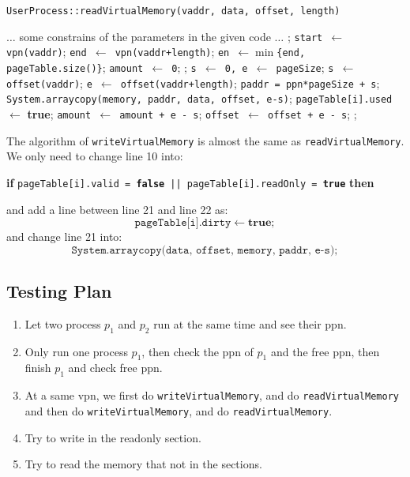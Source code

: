 \documentclass{article}
\begin{document}
\begin{spacing}{1.1}
\begin{algorithm}[htbp]
  \caption{\texttt{UserProcess::readVirtualMemory(vaddr, data, offset, length)}}
  \begin{algorithmic}[1]
    \State $\dots$ some constrains of the parameters in the given code $\dots$ 
    ;
    \EndIf
    \State \texttt{start $\gets$  vpn(vaddr)};
    \State \texttt{end $\gets$  vpn(vaddr+length)};
    \State \texttt{en $\gets \min$\{end, pageTable.size()\}};
    \State \texttt{amount $\gets$  0};
    ;
    \EndIf
    \State \texttt{s $\gets$ 0, e $\gets$ pageSize};
    \State \texttt{s $\gets$  offset(vaddr)};
    \EndIf
    \State \texttt{e $\gets$  offset(vaddr+length)};
    \EndIf
    \State \texttt{paddr = ppn*pageSize + s};
    \State \texttt{System.arraycopy(memory, paddr, data, offset, e-s)};
    \State \texttt{pageTable[i].used $\gets$}  \textbf{true};
    \State \texttt{amount  $\gets$  amount + e - s};
    \State \texttt{offset  $\gets$  offset + e - s};
    \EndFor
    ;
  \end{algorithmic}
\end{algorithm} 
The algorithm of \texttt{writeVirtualMemory} is almost the same as 
\texttt{readVirtualMemory}.
We only need to change line 10 into: \\
\begin{center}
  \textbf{if} \texttt{pageTable[i].valid = \textbf{false} || pageTable[i].readOnly = 
  \textbf{true}} \textbf{then}
\end{center}
and add a line between line 21 and line 22 as: 
\[ \texttt{pageTable[i].dirty}  \gets  \textbf{true}; \]
and change line 21 into: \\
\[ \texttt{System.arraycopy(data, offset, memory, paddr, e-s)}; \]


\subsection{Testing Plan}
\begin{enumerate}[$\bullet$]
  \item Let two process $p_1$ and $p_2$ run at the same time and see
    their ppn.
  \item Only run one process $p_1$, then check the ppn of $p_1$
    and the free ppn, then finish $p_1$ and check free ppn.
  \item At a same vpn, we first do \texttt{writeVirtualMemory},
    and do \texttt{readVirtualMemory} and then do \texttt{writeVirtualMemory},
    and do \texttt{readVirtualMemory}.
  \item Try to write in the readonly section.
  \item Try to read the memory that not in the sections.
\end{enumerate}




\end{spacing}
\end{document}
